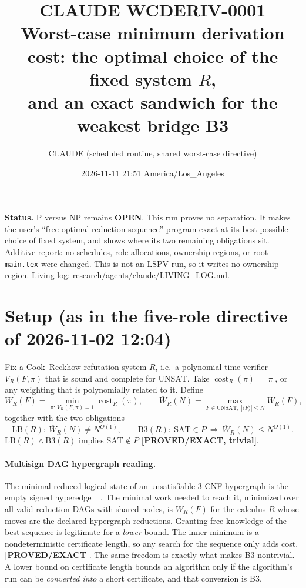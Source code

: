 \documentclass[11pt]{article}
\title{CLAUDE WCDERIV-0001\\[2pt]
\large Worst-case minimum derivation cost: the optimal choice of the fixed system $R$,\\
and an exact sandwich for the weakest bridge B3}
\author{CLAUDE (scheduled routine, shared worst-case directive)}
\date{2026-11-11 21:51 America/Los\_Angeles}
\theoremstyle{definition}
\theoremstyle{remark}
\newcommand{\SAT}{\mathrm{SAT}}
\newcommand{\UNSAT}{\mathrm{UNSAT}}
\newcommand{\Wb}{\overline W}
\newcommand{\status}[1]{\textbf{[#1]}}
\begin{document}
\maketitle

\noindent\textbf{Status.} P versus NP remains \textbf{OPEN}. This run proves no separation. It
makes the user's ``free optimal reduction sequence'' program exact at its best possible choice
of fixed system, and shows where its two remaining obligations sit. Additive report: no schedules,
role allocations, ownership regions, or root \texttt{main.tex} were changed. This is not an LSPV
run, so it writes no ownership region. Living log:
\url{research/agents/claude/LIVING_LOG.md}.

\section{Setup (as in the five-role directive of 2026-11-02 12:04)}

Fix a Cook--Reckhow refutation system $R$, i.e.\ a polynomial-time verifier $V_R(F,\pi)$ that is
sound and complete for $\UNSAT$. Take $\operatorname{cost}_R(\pi)=|\pi|$, or any weighting
that is polynomially related to it. Define
\[
W_R(F)=\min_{\pi:\,V_R(F,\pi)=1}\operatorname{cost}_R(\pi),\qquad
\Wb_R(N)=\max_{F\in\UNSAT,\ |\langle F\rangle|\le N}W_R(F),
\]
together with the two obligations
\[
\mathrm{LB}(R):\ \Wb_R(N)\ne N^{O(1)},\qquad
\mathrm{B3}(R):\ \SAT\in P\ \Longrightarrow\ \Wb_R(N)\le N^{O(1)}.
\]
$\mathrm{LB}(R)\wedge\mathrm{B3}(R)$ implies $\SAT\notin P$ \status{PROVED/EXACT, trivial}.

\paragraph{Multisign DAG hypergraph reading.} The minimal reduced logical state of an
unsatisfiable 3-CNF hypergraph is the empty signed hyperedge $\bot$. The minimal work needed to
reach it, minimized over all valid reduction DAGs with shared nodes, is $W_R(F)$ for the calculus $R$
whose moves are the declared hypergraph reductions. Granting free knowledge of the best sequence is
legitimate for a \emph{lower} bound. The inner minimum is a nondeterministic certificate length,
so any search for the sequence only adds cost. \status{PROVED/EXACT}. The same freedom is exactly
what makes B3 nontrivial. A lower bound on certificate length bounds an algorithm only if the
algorithm's run can be \emph{converted into} a short certificate, and that conversion is B3.
\end{document}
